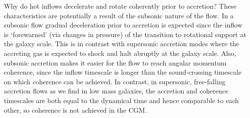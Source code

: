 \documentclass[fleqn,usenatbib]{mnras}
\begin{document}




Why do hot inflows decelerate and rotate coherently prior to accretion?
These characteristics are potentially a result of the subsonic nature of the flow. 
In a subsonic flow gradual deceleration prior to accretion is expected since the inflow is `forewarned' (via changes in pressure) of the transition to rotational support at the galaxy scale.
This is in contrast with supersonic accretion modes where the accreting gas is expected to shock and halt abruptly at the galaxy scale.
Also, subsonic accretion makes it easier for the flow to reach angular momentum coherence, since the inflow timescale is longer than the sound-crossing timescale on which coherence can be achieved. In contrast, in supersonic, free-falling accretion flows as we find in low mass galaxies, the accretion and coherence timescales are both equal to the dynamical time and hence comparable to each other, so coherence is not achieved in the CGM.
\end{document}
